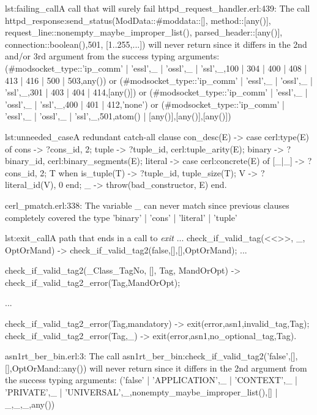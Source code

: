 

\begin{console}{lst:failing_call}{A call that will surely fail}
httpd_request_handler.erl:439: The call
httpd_response:send_status(ModData::#mod{data::[], method::[any()],
  request_line::nonempty_maybe_improper_list(),
  parsed_header::[any()], connection::boolean()},501, [1..255,...])
will never return since it differs in the 2nd and/or 3rd argument from
the success typing arguments: (#mod{socket_type::'ip_comm' |
  {'essl',_} | {'ossl',_} | {'ssl',_}},100 | 304 | 400 | 408 | 413 |
416 | 500 | 503,any()) or (#mod{socket_type::'ip_comm' | {'essl',_} |
  {'ossl',_} | {'ssl',_}},301 | 403 | 404 | 414,[any()]) or
(#mod{socket_type::'ip_comm' | {'essl',_} | {'ossl',_} |
  {'ssl',_}},400 | 401 | 412,'none') or (#mod{socket_type::'ip_comm' |
  {'essl',_} | {'ossl',_} | {'ssl',_}},501,{atom() |
  [any()],[any()],[any()]})

\end{console}

\begin{console}{lst:unneeded_case}{A redundant catch-all clause}
con_desc(E) ->
    case cerl:type(E) of
	cons -> {?cons_id, 2};
	tuple -> {?tuple_id, cerl:tuple_arity(E)};
	binary -> {?binary_id, cerl:binary_segments(E)};
	literal ->
	    case cerl:concrete(E) of
		[_|_] -> {?cons_id, 2};
		T when is_tuple(T) -> {?tuple_id, tuple_size(T)};
		V -> {?literal_id(V), 0}
	    end;
	_ ->
	    throw({bad_constructor, E})
    end.


cerl_pmatch.erl:338: The variable _ can never match since previous clauses
completely covered the type 'binary' | 'cons' | 'literal' | 'tuple'
\end{console}

\begin{code}{lst:exit_call}{A path that ends in a call to \emph{exit}}
...
check_if_valid_tag(<<>>, _, OptOrMand) ->
    check_if_valid_tag2(false,[],[],OptOrMand);
...

check_if_valid_tag2(_Class_TagNo, [], Tag, MandOrOpt) ->
    check_if_valid_tag2_error(Tag,MandOrOpt);

...

check_if_valid_tag2_error(Tag,mandatory) ->
    exit({error,{asn1,{invalid_tag,Tag}}});
check_if_valid_tag2_error(Tag,_) ->
    exit({error,{asn1,{no_optional_tag,Tag}}}).


asn1rt_ber_bin.erl:3: The call
asn1rt_ber_bin:check_if_valid_tag2('false',[],[],OptOrMand::any()) will never
return since it differs in the 2nd argument from the success typing arguments:
('false' | {'APPLICATION',_} | {'CONTEXT',_} | {'PRIVATE',_} |
{'UNIVERSAL',_},nonempty_maybe_improper_list(),[] | {_,_,_},any())
\end{code}


